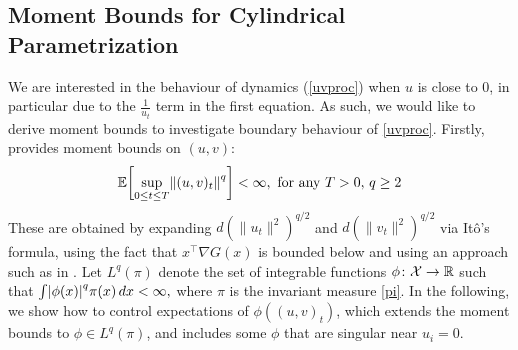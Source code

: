 \documentclass[11pt, twoside]{report}
\begin{document}
\subsection{Moment Bounds for Cylindrical Parametrization}
We are interested in the behaviour of dynamics (\ref{uvproc}) when $u$ is close to 0, in particular due to the $\frac{1}{u_t}$ term in the first equation. As such, we would like to derive moment bounds to investigate boundary behaviour of \ref{uvproc}. Firstly, \cite[Theorem~3.1]{2025hadalangsamp} provides moment bounds on $(u,v)$: 
\begin{equation} \label{uv_moment}
    \mean{\sup_{0\le t\le T} \norm{(u,v)_t}^q}<\infty,\text{ for any }T>0, \, q\ge 2
\end{equation}
These are obtained by expanding $d(\|u_t\|^2)^{q/2}$ and $d(\|v_t\|^2)^{q/2}$ via It\^{o}'s formula, using the fact that $x^\top \nabla G(x)$ is bounded below and using an approach such as in \cite[Theorem 4.4]{Mao2008-ur}. Let $L^q(\pi)$ denote the set of integrable functions $\phi\colon\mathcal X\to\mathbb{R}$ such that $\int \abs{\phi(x)}^q \pi(x)\,dx<\infty,$ where $\pi$ is the invariant measure \ref{pi}. In the following,  we show how to control expectations of $\phi((u,v)_t)$, which extends the moment bounds to $\phi\in L^q(\pi)$, and includes some $\phi$ that are singular near $u_i=0$.
\end{document}
